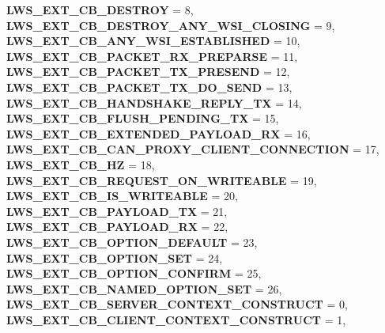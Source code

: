 \begin{DoxyCompactItemize}
\newline
{\bfseries L\+W\+S\+\_\+\+E\+X\+T\+\_\+\+C\+B\+\_\+\+D\+E\+S\+T\+R\+OY} = 8, 
{\bfseries L\+W\+S\+\_\+\+E\+X\+T\+\_\+\+C\+B\+\_\+\+D\+E\+S\+T\+R\+O\+Y\+\_\+\+A\+N\+Y\+\_\+\+W\+S\+I\+\_\+\+C\+L\+O\+S\+I\+NG} = 9, 
{\bfseries L\+W\+S\+\_\+\+E\+X\+T\+\_\+\+C\+B\+\_\+\+A\+N\+Y\+\_\+\+W\+S\+I\+\_\+\+E\+S\+T\+A\+B\+L\+I\+S\+H\+ED} = 10, 
{\bfseries L\+W\+S\+\_\+\+E\+X\+T\+\_\+\+C\+B\+\_\+\+P\+A\+C\+K\+E\+T\+\_\+\+R\+X\+\_\+\+P\+R\+E\+P\+A\+R\+SE} = 11, 
\newline
{\bfseries L\+W\+S\+\_\+\+E\+X\+T\+\_\+\+C\+B\+\_\+\+P\+A\+C\+K\+E\+T\+\_\+\+T\+X\+\_\+\+P\+R\+E\+S\+E\+ND} = 12, 
{\bfseries L\+W\+S\+\_\+\+E\+X\+T\+\_\+\+C\+B\+\_\+\+P\+A\+C\+K\+E\+T\+\_\+\+T\+X\+\_\+\+D\+O\+\_\+\+S\+E\+ND} = 13, 
{\bfseries L\+W\+S\+\_\+\+E\+X\+T\+\_\+\+C\+B\+\_\+\+H\+A\+N\+D\+S\+H\+A\+K\+E\+\_\+\+R\+E\+P\+L\+Y\+\_\+\+TX} = 14, 
{\bfseries L\+W\+S\+\_\+\+E\+X\+T\+\_\+\+C\+B\+\_\+\+F\+L\+U\+S\+H\+\_\+\+P\+E\+N\+D\+I\+N\+G\+\_\+\+TX} = 15, 
\newline
{\bfseries L\+W\+S\+\_\+\+E\+X\+T\+\_\+\+C\+B\+\_\+\+E\+X\+T\+E\+N\+D\+E\+D\+\_\+\+P\+A\+Y\+L\+O\+A\+D\+\_\+\+RX} = 16, 
{\bfseries L\+W\+S\+\_\+\+E\+X\+T\+\_\+\+C\+B\+\_\+\+C\+A\+N\+\_\+\+P\+R\+O\+X\+Y\+\_\+\+C\+L\+I\+E\+N\+T\+\_\+\+C\+O\+N\+N\+E\+C\+T\+I\+ON} = 17, 
{\bfseries L\+W\+S\+\_\+\+E\+X\+T\+\_\+\+C\+B\+\_\+HZ} = 18, 
{\bfseries L\+W\+S\+\_\+\+E\+X\+T\+\_\+\+C\+B\+\_\+\+R\+E\+Q\+U\+E\+S\+T\+\_\+\+O\+N\+\_\+\+W\+R\+I\+T\+E\+A\+B\+LE} = 19, 
\newline
{\bfseries L\+W\+S\+\_\+\+E\+X\+T\+\_\+\+C\+B\+\_\+\+I\+S\+\_\+\+W\+R\+I\+T\+E\+A\+B\+LE} = 20, 
{\bfseries L\+W\+S\+\_\+\+E\+X\+T\+\_\+\+C\+B\+\_\+\+P\+A\+Y\+L\+O\+A\+D\+\_\+\+TX} = 21, 
{\bfseries L\+W\+S\+\_\+\+E\+X\+T\+\_\+\+C\+B\+\_\+\+P\+A\+Y\+L\+O\+A\+D\+\_\+\+RX} = 22, 
{\bfseries L\+W\+S\+\_\+\+E\+X\+T\+\_\+\+C\+B\+\_\+\+O\+P\+T\+I\+O\+N\+\_\+\+D\+E\+F\+A\+U\+LT} = 23, 
\newline
{\bfseries L\+W\+S\+\_\+\+E\+X\+T\+\_\+\+C\+B\+\_\+\+O\+P\+T\+I\+O\+N\+\_\+\+S\+ET} = 24, 
{\bfseries L\+W\+S\+\_\+\+E\+X\+T\+\_\+\+C\+B\+\_\+\+O\+P\+T\+I\+O\+N\+\_\+\+C\+O\+N\+F\+I\+RM} = 25, 
{\bfseries L\+W\+S\+\_\+\+E\+X\+T\+\_\+\+C\+B\+\_\+\+N\+A\+M\+E\+D\+\_\+\+O\+P\+T\+I\+O\+N\+\_\+\+S\+ET} = 26, 
{\bfseries L\+W\+S\+\_\+\+E\+X\+T\+\_\+\+C\+B\+\_\+\+S\+E\+R\+V\+E\+R\+\_\+\+C\+O\+N\+T\+E\+X\+T\+\_\+\+C\+O\+N\+S\+T\+R\+U\+CT} = 0, 
\newline
{\bfseries L\+W\+S\+\_\+\+E\+X\+T\+\_\+\+C\+B\+\_\+\+C\+L\+I\+E\+N\+T\+\_\+\+C\+O\+N\+T\+E\+X\+T\+\_\+\+C\+O\+N\+S\+T\+R\+U\+CT} = 1, 

\end{DoxyCompactItemize}
